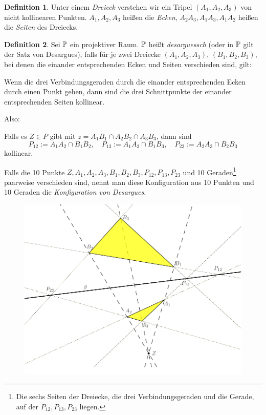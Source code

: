 \documentclass[
 a4paper,
 12pt,
 parskip=half
 ]{scrartcl}
\theoremstyle{plain}
\theoremstyle{definition}
\newtheorem*{defn*}{Definition}
\begin{document}
\begin{defn*}
 Unter einem \emph{Dreieck} verstehen wir ein Tripel $(A_1, A_2, A_3)$ von nicht kollinearen Punkten. $A_1, A_2, A_3$ heißen die \emph{Ecken}, $A_2 A_3, A_1 A_3, A_1 A_2$ heißen die \emph{Seiten} des Dreiecks.
\end{defn*}

\begin{defn*}
 Sei $\mathbb{P}$ ein projektiver Raum. $\mathbb{P}$ heißt \emph{desarguessch} (oder in $\mathbb{P}$ gilt der Satz von Desargues), falls für je zwei Dreiecke $(A_1, A_2, A_3)$, $(B_1, B_2, B_3)$, bei denen die einander entsprechenden Ecken und Seiten verschieden sind, gilt: 
 \begin{addmargin}{1cm} 
 Wenn die drei Verbindungsgeraden durch die einander entsprechenden Ecken durch einen Punkt gehen, dann sind die drei Schnittpunkte der einander entsprechenden Seiten kollinear. 
 \end{addmargin}
 Also:
 \begin{addmargin}{1cm} 
 Falls es $Z \in P$ gibt mit $z = A_1 B_1 \cap A_2 B_2 \cap A_3 B_3$, dann sind
 \[ P_{12} := A_1 A_2 \cap B_1 B_2, \quad P_{13} := A_1 A_3 \cap B_1 B_3, \quad P_{23} := A_2 A_3 \cap B_2 B_3 \]
 kollinear.
 \end{addmargin}

 Falls die 10 Punkte $Z, A_1, A_2, A_3, B_1, B_2, B_3, P_{12}, P_{13}, P_{23}$ und 10 Geraden\footnote{Die sechs Seiten der Dreiecke, die drei Verbindungsgeraden und die Gerade, auf der $P_{12}, P_{13}, P_{23}$ liegen.}  paarweise verschieden sind, nennt man diese Konfiguration aus 10 Punkten und 10 Geraden die \emph{Konfiguration von Desargues}.
\end{defn*}

\begin{figure}[ht]
 \center
 \includegraphics[width=12cm]{img/desargues}
\end{figure}
\end{document}
